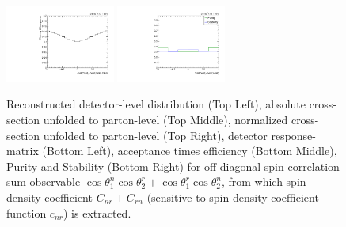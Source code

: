 \begin{figure}[htb]
\begin{center}
 \includegraphics[width=0.32\textwidth]{fig_fullRun2UL/unfolding/combined/TotEff_c_Pnr.pdf}
 \includegraphics[width=0.32\textwidth]{fig_fullRun2UL/unfolding/combined/PurStab_c_Pnr.pdf} \\
\caption{Reconstructed detector-level distribution (Top Left), absolute cross-section unfolded to parton-level (Top Middle), normalized cross-section unfolded to parton-level (Top Right), detector response-matrix (Bottom Left), acceptance times efficiency (Bottom Middle), Purity and Stability (Bottom Right) for off-diagonal spin correlation sum observable $\cos\theta_{1}^{n}\cos\theta_{2}^{r}+\cos\theta_{1}^{r}\cos\theta_{2}^{n}$, from which spin-density coefficient $C_{nr}+C_{rn}$ (sensitive to spin-density coefficient function $c_{n r}$) is extracted.}
\label{fig:c_Pnr}
\end{center}
\end{figure}
\clearpage

